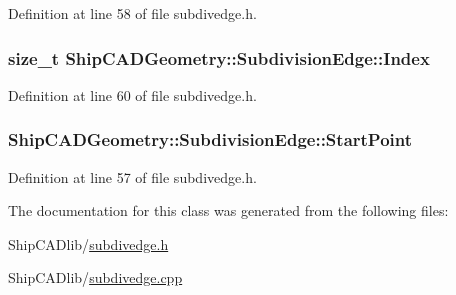 Definition at line 58 of file subdivedge.\-h.

\hypertarget{classShipCADGeometry_1_1SubdivisionEdge_a5d959fb5043fcad1c24e603b50e9fa95}{
\subsubsection[{Index}]{\setlength{\rightskip}{0pt plus 5cm}size\-\_\-t Ship\-C\-A\-D\-Geometry\-::\-Subdivision\-Edge\-::\-Index\hspace{0.3cm}{\ttfamily [read]}}}\label{classShipCADGeometry_1_1SubdivisionEdge_a5d959fb5043fcad1c24e603b50e9fa95}


Definition at line 60 of file subdivedge.\-h.

\hypertarget{classShipCADGeometry_1_1SubdivisionEdge_add30db0d6a7aac1c8f081012f3cccf03}{
\subsubsection[{Start\-Point}]{ Ship\-C\-A\-D\-Geometry\-::\-Subdivision\-Edge\-::\-Start\-Point\hspace{0.3cm}{\ttfamily [read]}}}\label{classShipCADGeometry_1_1SubdivisionEdge_add30db0d6a7aac1c8f081012f3cccf03}


Definition at line 57 of file subdivedge.\-h.



The documentation for this class was generated from the following files\-:\begin{DoxyCompactItemize}
\item 
Ship\-C\-A\-Dlib/\hyperlink{subdivedge_8h}{subdivedge.\-h}\item 
Ship\-C\-A\-Dlib/\hyperlink{subdivedge_8cpp}{subdivedge.\-cpp}\end{DoxyCompactItemize}
